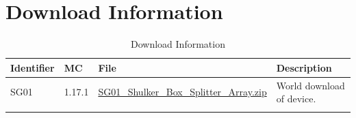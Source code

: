 \documentclass[10pt]{datasheet}
\begin{document}
\section{Download Information}
\begin{table}[h]
    \caption{Download Information}
    \begin{tabularx}{\textwidth}{l | l | l | X}
        \thickhline
        \textbf{Identifier} & \textbf{MC} & \textbf{File} & \textbf{Description} \\
        \hline
        SG01 & 1.17.1 & \href{https://github.com/Soontech-Annals/Archive/blob/364bde8dbcbc2e5337489ff435bcda9b387017e2/Archive/splitting/SG01\%20Shulker\%20Box\%20Splitter\%20Array/SG01\_Shulker\_Box\_Splitter\_Array.zip?raw=1}{SG01\_Shulker\_Box\_Splitter\_Array.zip} & World download of device. \\
        \hline
        \thickhline
    \end{tabularx}
\end{table}
\end{document}
